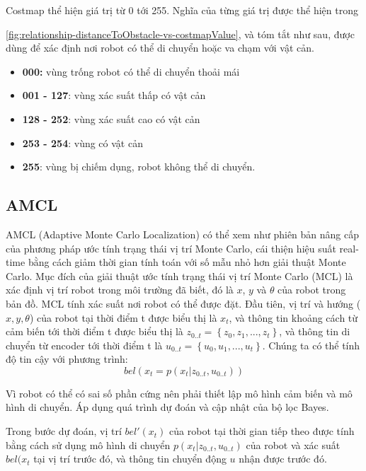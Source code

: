 Costmap thể hiện giá trị từ 0 tới 255. Nghĩa của từng giá trị được thể hiện trong \figurename{\ref{fig:relationship-distanceToObstacle-vs-costmapValue}, và tóm tắt như sau, được dùng để xác định nơi robot có thể di chuyển hoặc va chạm với vật cản.

\begin{itemize}
  \item \textbf{000:} vùng trống robot có thể di chuyển thoải mái
  \item \textbf{001 - 127}: vùng xác suất thấp có vật cản
  \item \textbf{128 - 252}: vùng xác suất cao có vật cản
  \item \textbf{253 - 254}: vùng có vật cản
  \item \textbf{255}: vùng bị chiếm dụng, robot không thể di chuyển.
\end{itemize}

\subsection{AMCL}
AMCL (Adaptive Monte Carlo Localization) có thể xem như phiên bản nâng cấp của phương pháp ước tính trạng thái vị trí Monte Carlo, cái thiện hiệu suất real-time bằng cách giảm thời gian tính toán với số mẫu nhỏ hơn giải thuật Monte Carlo.
Mục đích của giải thuật ước tính trạng thái vị trí Monte Carlo (MCL) là xác định vị trí robot trong môi trường đã biết, đó là $x$, $y$ và $\theta$ của robot trong bản đồ.
MCL tính xác suất nơi robot có thể được đặt. Đầu tiên, vị trí và hướng ($x, y, \theta$) của robot tại thời điểm t được biểu thị là ${x}_{t}$,
và thông tin khoảng cách từ cảm biến tới thời điểm t được biểu thị là ${z}_{0..t} = \left\{{z}_{0}, {z}_{1}, ..., {z}_{t}\right\}$, và thông tin di chuyển từ encoder tới thời điểm t là ${u}_{0..t} = \left\{{u}_{0}, {u}_{1}, ..., {u}_{t}\right\}$. Chúng ta có thể tính độ tin cậy với phương trình:
\begin{equation}
  bel({x}_{t} = p\left({x}_ {t}|{z}_{0..t}, {u}_{0..t}\right))
\end{equation}

Vì robot có thể có sai số phần cứng nên phải thiết lập mô hình cảm biến và mô hình di chuyển. Áp dụng quá trình dự đoán và cập nhật của bộ lọc Bayes.

Trong bước dự đoán, vị trí $bel'\left({x}_{t}\right)$ của robot tại thời gian tiếp theo được tính bằng cách sử dụng mô hình di chuyển $p\left({x}_ {t}|{z}_{0..t}, {u}_{0..t}\right)$ của robot và xác suất $bel({x}_{t}$ tại vị trí trước đó, và thông tin chuyển động $u$ nhận được trước đó.

}
